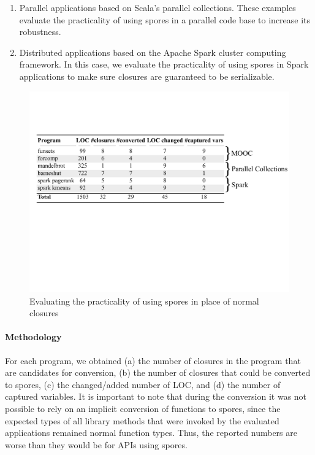\documentclass[runningheads]{llncs}
\begin{document}
\begin{sloppypar}
\begin{enumerate}
\item Parallel applications based on Scala's parallel collections. These examples evaluate the practicality of using spores in a parallel code base to increase its robustness.

\item Distributed applications based on the Apache Spark cluster computing framework. In this case, we evaluate the practicality of using spores in Spark applications to make sure closures are guaranteed to be serializable.
\vspace{-2mm}
\end{enumerate}

\begin{figure}[t!]
\centering
\includegraphics[width=\textwidth]{evaluation.pdf}
\caption{Evaluating the practicality of using spores in place of normal closures}
\label{fig:spore-eval}
\vspace{-5mm}
\end{figure}

\paragraph{\textbf{Methodology}} For each program, we obtained (a) the number of closures in the program that are candidates for conversion, (b) the number of closures that could be converted to spores, (c) the changed/added number of LOC, and (d) the number of captured variables. It is important to note that during the conversion it was not possible to rely on an implicit conversion of functions to spores, since the expected types of all library methods that were invoked by the evaluated applications remained normal function types. Thus, the reported numbers are worse than they would be for APIs using spores.


\end{sloppypar}
\end{document}
